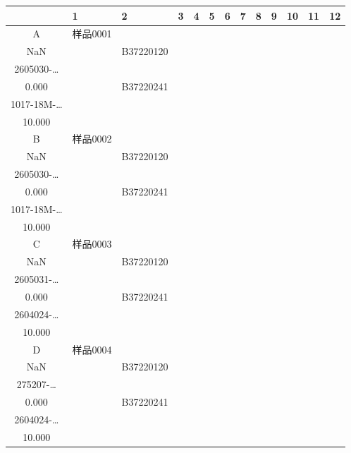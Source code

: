 \documentclass[UTF8,10pt,a4paper,fontset=fandol]{ctexart}
\newcommand{\fieldvalue}[1]{#1}
\begin{document}
\begin{center}
\scriptsize
\begin{tabular}{c|p{1.05cm}|p{1.05cm}|p{1.05cm}|p{1.05cm}|p{1.05cm}|p{1.05cm}|p{1.05cm}|p{1.05cm}|p{1.05cm}|p{1.05cm}|p{1.05cm}|p{1.05cm}}
 & 1&2&3&4&5&6&7&8&9&10&11&12\\ \hline
A&
\fieldvalue{\scriptsize 样品0001\\NaN}
&&
\fieldvalue{\scriptsize B37220120\\2605030-\ldots\\0.000}
&&
\fieldvalue{\scriptsize B37220241\\1017-18M-\ldots\\10.000}
&&&&&&&\\ \hline
B&
\fieldvalue{\scriptsize 样品0002\\NaN}
&&
\fieldvalue{\scriptsize B37220120\\2605030-\ldots\\0.000}
&&
\fieldvalue{\scriptsize B37220241\\1017-18M-\ldots\\10.000}
&&&&&&&\\ \hline
C&
\fieldvalue{\scriptsize 样品0003\\NaN}
&&
\fieldvalue{\scriptsize B37220120\\2605031-\ldots\\0.000}
&&
\fieldvalue{\scriptsize B37220241\\2604024-\ldots\\10.000}
&&&&&&&\\ \hline
D&
\fieldvalue{\scriptsize 样品0004\\NaN}
&&
\fieldvalue{\scriptsize B37220120\\275207-\ldots\\0.000}
&&
\fieldvalue{\scriptsize B37220241\\2604024-\ldots\\10.000}

\end{tabular}
\end{center}
\end{document}
